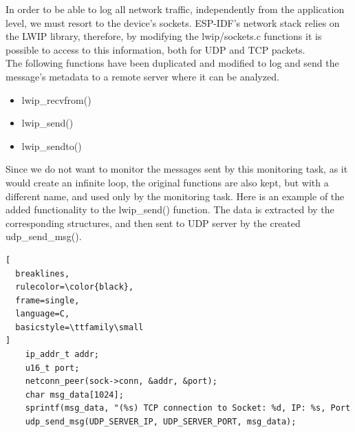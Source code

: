 In order to be able to log all network traffic, independently from the application level, we must resort to the device's sockets. ESP-IDF's network stack relies on the LWIP library, therefore, by modifying the lwip/sockets.c functions it is possible to access to this information, both for UDP and TCP packets.\\

The following functions have been duplicated and modified to log and send the message's metadata to a remote server where it can be analyzed. 
\begin{itemize}
    \item lwip\_recvfrom()
    \item lwip\_send()
    \item lwip\_sendto()
\end{itemize}
Since we do not want to monitor the messages sent by this monitoring task, as it would create an infinite loop, the original functions are also kept, but with a different name, and used only by the monitoring task. Here is an example of the added functionality to the lwip\_send() function. The data is extracted by the corresponding structures, and then sent to UDP server by the created udp\_send\_msg(). 
\begin{lstlisting}[
  breaklines,
  rulecolor=\color{black},
  frame=single,
  language=C,
  basicstyle=\ttfamily\small
]
    ip_addr_t addr;
    u16_t port;
    netconn_peer(sock->conn, &addr, &port);
    char msg_data[1024];
    sprintf(msg_data, "(%s) TCP connection to Socket: %d, IP: %s, Port 
    udp_send_msg(UDP_SERVER_IP, UDP_SERVER_PORT, msg_data);
\end{lstlisting}


